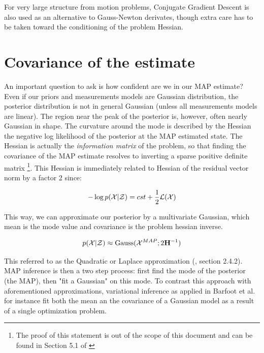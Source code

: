 For very large structure from motion problems, Conjugate Gradient Descent is also used as an alternative to Gauss-Newton derivates, though extra care has to 
be taken toward the conditioning of the problem Hessian.





\section{Covariance of the estimate}

An important question to ask is how confident are we in our MAP estimate? Even if our priors and measurements models are Gaussian distribution, the posterior distribution
is not in general Gaussian (unless all measurements models are linear). The region near the peak of the posterior is, however, often nearly Gaussian in shape.
The curvature around the mode is described by the Hessian the negative log likelihood of the posterior at the MAP estimated state. 
The Hessian is actually the \textit{information matrix} of the problem, so that finding the covariance of the MAP estimate resolves to inverting a 
sparse positive definite matrix \footnote{The proof of this statement is out of the scope of this document and can be found in Section 5.1 of 
\cite{peng2018advanced}}. This Hessian is immediately related to Hessian of the residual vector norm by a factor 2 since:

\begin{equation*}
    -\log p(\mathcal{X}|\mathcal{Z}) = cst + \frac{1}{2}\mathcal{L}(\mathcal{X})
\end{equation*}

This way, we can approximate our posterior by a multivariate Gaussian, which mean is the mode value and covariance 
is the problem hessian inverse. 

\begin{equation}
    p(\mathcal{X} | \mathcal{Z}) \approx \text{Gauss}(\mathcal{X}^{MAP}; 2{\bf H}^{-1})
    \label{eq:map_laplace}
\end{equation}

This referred to as the Quadratic or Laplace approximation (\cite{mcelreath2018statistical}, section 2.4.2). MAP inference is then a two step process: 
first find the mode of the posterior (the MAP), then "fit a Gaussian" on this mode. 
To contrast this approach with aforementioned approximations, variational inference as applied in Barfoot et al. 
 \cite{barfoot2020exactly} for instance fit both the mean an the covariance of a Gaussian model as a result of a single optimization problem.


